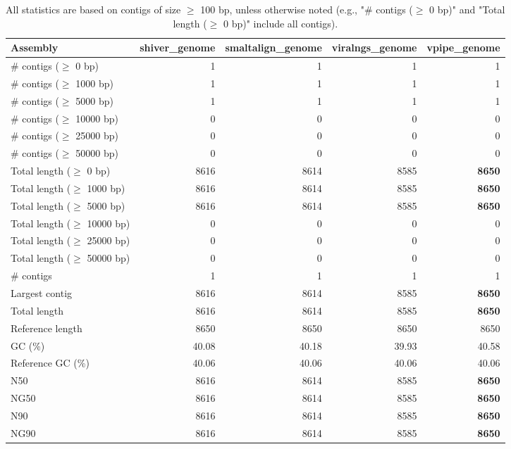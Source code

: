 \documentclass[12pt,a4paper]{article}
\begin{document}
\begin{table}[ht]
\begin{center}
\caption{All statistics are based on contigs of size $\geq$ 100 bp, unless otherwise noted (e.g., "\# contigs ($\geq$ 0 bp)" and "Total length ($\geq$ 0 bp)" include all contigs).}
\begin{tabular}{|l*{4}{|r}|}
\hline
Assembly & shiver\_genome & smaltalign\_genome & viralngs\_genome & vpipe\_genome \\ \hline
\# contigs ($\geq$ 0 bp) & 1 & 1 & 1 & 1 \\ \hline
\# contigs ($\geq$ 1000 bp) & 1 & 1 & 1 & 1 \\ \hline
\# contigs ($\geq$ 5000 bp) & 1 & 1 & 1 & 1 \\ \hline
\# contigs ($\geq$ 10000 bp) & 0 & 0 & 0 & 0 \\ \hline
\# contigs ($\geq$ 25000 bp) & 0 & 0 & 0 & 0 \\ \hline
\# contigs ($\geq$ 50000 bp) & 0 & 0 & 0 & 0 \\ \hline
Total length ($\geq$ 0 bp) & 8616 & 8614 & 8585 & {\bf 8650} \\ \hline
Total length ($\geq$ 1000 bp) & 8616 & 8614 & 8585 & {\bf 8650} \\ \hline
Total length ($\geq$ 5000 bp) & 8616 & 8614 & 8585 & {\bf 8650} \\ \hline
Total length ($\geq$ 10000 bp) & 0 & 0 & 0 & 0 \\ \hline
Total length ($\geq$ 25000 bp) & 0 & 0 & 0 & 0 \\ \hline
Total length ($\geq$ 50000 bp) & 0 & 0 & 0 & 0 \\ \hline
\# contigs & 1 & 1 & 1 & 1 \\ \hline
Largest contig & 8616 & 8614 & 8585 & {\bf 8650} \\ \hline
Total length & 8616 & 8614 & 8585 & {\bf 8650} \\ \hline
Reference length & 8650 & 8650 & 8650 & 8650 \\ \hline
GC (\%) & 40.08 & 40.18 & 39.93 & 40.58 \\ \hline
Reference GC (\%) & 40.06 & 40.06 & 40.06 & 40.06 \\ \hline
N50 & 8616 & 8614 & 8585 & {\bf 8650} \\ \hline
NG50 & 8616 & 8614 & 8585 & {\bf 8650} \\ \hline
N90 & 8616 & 8614 & 8585 & {\bf 8650} \\ \hline
NG90 & 8616 & 8614 & 8585 & {\bf 8650} \\ \hline

\end{tabular}
\end{center}
\end{table}
\end{document}
